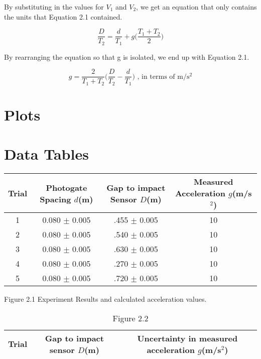 \documentclass[11pt]{report}
\begin{document}
By substituting in the values for \(V_1\) and \(V_2\), we get an equation that
only contains the units that Equation 2.1 contained.

\[ \frac{D}{T_2} = \frac{d}{T_1} + g\Bigg(\frac{T_1 + T_2}{2}\Bigg) \]

By rearranging the equation so that g is isolated, we end up with Equation 2.1.

\[ g = \frac{2}{T_1 + T_2}\Bigg(\frac{D}{T_2} - \frac{d}{T_1}\Bigg) \textrm{ , in
terms of m/s$^2$}\]

\section*{Plots}

\section*{Data Tables}
\begin{center}
    \begin{tabular}{|c | c | c | c |}
    \hline
    Trial & Photogate Spacing \(d\)(m) & Gap to impact Sensor \(D\)(m) & Measured Acceleration \(g\)(m/s$^2$) \\
    \hline
    1 & 0.080 $\pm$ 0.005 & .455 $\pm$ 0.005 & 10 \\
    \hline
    2 & 0.080 $\pm$ 0.005 & .540 $\pm$ 0.005 & 10 \\
    \hline
    3 & 0.080 $\pm$ 0.005 & .630 $\pm$ 0.005 & 10 \\
    \hline
    4 & 0.080 $\pm$ 0.005 & .270 $\pm$ 0.005 & 10 \\
    \hline
    5 & 0.080 $\pm$ 0.005 & .720 $\pm$ 0.005 & 10 \\
    \hline
    \end{tabular}
    Figure 2.1 Experiment Results and calculated acceleration values.
\end{center}

\begin{table}[h]
    \centering
    \begin{tabular}{| c | c | c |}
        \hline
        Trial & Gap to impact sensor \(D\)(m) & Uncertainty in measured
        acceleration \(g\)(m/s$^2$) \\
        \hline
    \end{tabular}
    \caption{Figure 2.2}
    \label{table:2}
\end{table}
\end{document}
